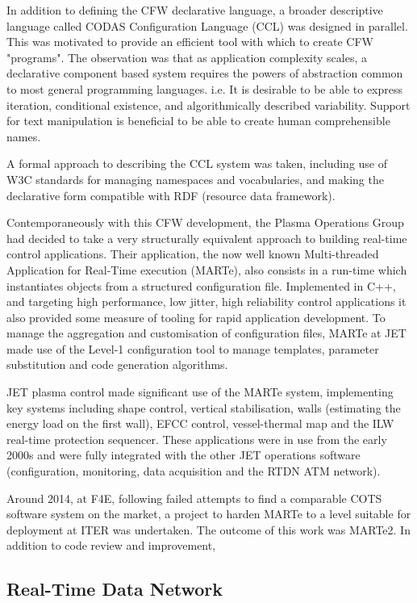 \documentclass[preprint,12pt]{elsarticle}
\begin{document}
In addition to defining the CFW declarative language, a broader descriptive language
called CODAS Configuration Language (CCL) was designed in parallel.  This was motivated 
to provide an efficient tool with which to create CFW "programs".  The observation
was that as application complexity scales, a declarative component based system
requires the powers of abstraction common to most general programming languages.
i.e. It is desirable to be able to express iteration, conditional existence, 
and algorithmically described variability.  Support for text manipulation is
beneficial to be able to create human comprehensible names.

A formal approach to describing the CCL system was taken, including use of W3C
standards for managing namespaces and vocabularies, and making the declarative
form compatible with RDF (resource data framework).

Contemporaneously with this CFW development, the Plasma Operations Group had decided
to take a very structurally equivalent approach to building real-time control applications.
Their application, the now well known Multi-threaded Application for Real-Time execution (MARTe),
also consists in a run-time which instantiates objects from a structured configuration file.
Implemented in C++, and targeting high performance, low jitter, high reliability control
applications it also provided some measure of tooling for rapid application development.
To manage the aggregation and customisation of configuration files, MARTe at JET made
use of the Level-1 configuration tool to manage templates, parameter substitution and
code generation algorithms.

JET plasma control made significant use of the MARTe system, implementing key systems
including shape control, vertical stabilisation, walls (estimating the energy load on the first wall),
EFCC control, vessel-thermal map and the ILW real-time protection sequencer.  These applications
were in use from the early 2000s and were fully integrated with the other JET operations software
(configuration, monitoring, data acquisition and the RTDN ATM network).

Around 2014, at F4E, following failed attempts to find a comparable COTS software system 
on the market, a project to harden MARTe to a level suitable for deployment at ITER 
was undertaken.  The outcome of this work was MARTe2.  In addition to code review and improvement,


\subsection{Real-Time Data Network}
\end{document}
